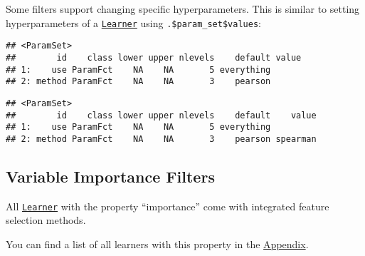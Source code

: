 \documentclass[
]{scrbook}
\newenvironment{Shaded}{\begin{snugshade}}{\end{snugshade}}
\newcommand{\AttributeTok}[1]{\textcolor[rgb]{0.77,0.63,0.00}{#1}}
\newcommand{\CommentTok}[1]{\textcolor[rgb]{0.56,0.35,0.01}{\textit{#1}}}
\newcommand{\FunctionTok}[1]{\textcolor[rgb]{0.00,0.00,0.00}{#1}}
\newcommand{\NormalTok}[1]{#1}
\newcommand{\OtherTok}[1]{\textcolor[rgb]{0.56,0.35,0.01}{#1}}
\newcommand{\SpecialCharTok}[1]{\textcolor[rgb]{0.00,0.00,0.00}{#1}}
\newcommand{\StringTok}[1]{\textcolor[rgb]{0.31,0.60,0.02}{#1}}
\renewenvironment{Shaded} {\begin{snugshade}\small} {\end{snugshade}}
\begin{document}
Some filters support changing specific hyperparameters.
This is similar to setting hyperparameters of a \href{https://mlr3.mlr-org.com/reference/Learner.html}{\texttt{Learner}} using \texttt{.\$param\_set\$values}:

\begin{Shaded}
\end{Shaded}

\begin{verbatim}
## <ParamSet>
##        id    class lower upper nlevels    default value
## 1:    use ParamFct    NA    NA       5 everything      
## 2: method ParamFct    NA    NA       3    pearson
\end{verbatim}

\begin{Shaded}
\end{Shaded}

\begin{verbatim}
## <ParamSet>
##        id    class lower upper nlevels    default    value
## 1:    use ParamFct    NA    NA       5 everything         
## 2: method ParamFct    NA    NA       3    pearson spearman
\end{verbatim}

\hypertarget{fs-var-imp-filters}{%
\subsection{Variable Importance Filters}\label{fs-var-imp-filters}}

All \href{https://mlr3.mlr-org.com/reference/Learner.html}{\texttt{Learner}} with the property ``importance'' come with integrated feature selection methods.

You can find a list of all learners with this property in the \protect\hyperlink{fs-filter-embedded-list}{Appendix}.
\end{document}
